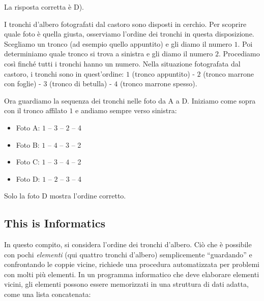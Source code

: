 \documentclass[a4paper,11pt]{report}
\newcommand{\taskGraphicsFolder}{..}
\begin{document}
La risposta corretta è D). \raisebox{-0.5ex}{}

I tronchi d’albero fotografati dal castoro sono disposti in cerchio. Per scoprire quale foto è quella giusta, osserviamo l’ordine dei tronchi in questa disposizione. Scegliamo un tronco (ad esempio quello appuntito) e gli diamo il numero $1$. Poi determiniamo quale tronco si trova a sinistra e gli diamo il numero $2$. Procediamo così finché tutti i tronchi hanno un numero. Nella situazione fotografata dal castoro, i tronchi sono in quest’ordine: $1$ (tronco appuntito) - $2$ (tronco marrone con foglie) - $3$ (tronco di betulla) - $4$ (tronco marrone spesso).

{\centering%
\par}

Ora guardiamo la sequenza dei tronchi nelle foto da A a D. Iniziamo come sopra con il tronco affilato $1$ e andiamo sempre verso sinistra:

\begin{itemize}
  \item Foto A: $1$ – $3$ – $2$ – 4
  \item Foto B: $1$ – $4$ – $3$ – 2
  \item Foto C: $1$ – $3$ – $4$ – 2
  \item Foto D: $1$ – $2$ – $3$ – 4
\end{itemize}

Solo la foto D mostra l’ordine corretto.

{\centering%
\par}


\subsection*{This is Informatics}

In questo compito, si considera l’ordine dei tronchi d’albero. Ciò che è possibile con pochi \emph{elementi} (qui quattro tronchi d’albero) semplicemente \enquote{guardando} e confrontando le coppie vicine, richiede una procedura automatizzata per problemi con molti più elementi. In un programma informatico che deve elaborare elementi vicini, gli elementi possono essere memorizzati in una struttura di dati adatta, come una lista concatenata:

{\centering%
\par}
\end{document}
